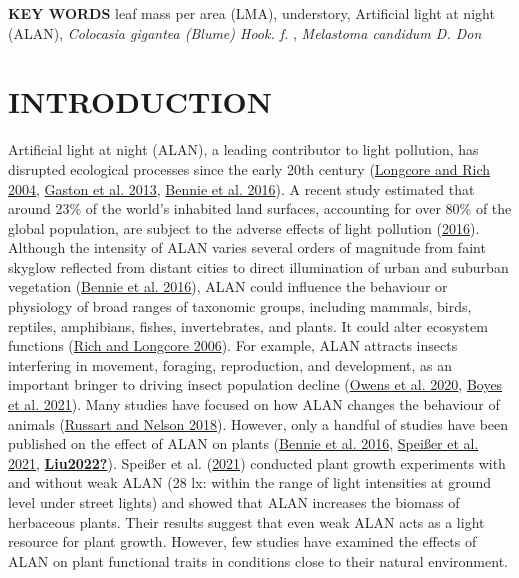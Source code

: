 \documentclass[
  12pt,
  letterpaper,
  DIV=11,
  numbers=noendperiod]{scrartcl}
\begin{document}
\textbf{KEY WORDS} leaf mass per area (LMA), understory, Artificial
light at night (ALAN), \emph{Colocasia gigantea (Blume) Hook. f.} ,
\emph{Melastoma candidum D. Don}

\hypertarget{introduction}{%
\section{INTRODUCTION}\label{introduction}}

Artificial light at night (ALAN), a leading contributor to light
pollution, has disrupted ecological processes since the early 20th
century (\protect\hyperlink{ref-Longcore2004}{Longcore and Rich 2004},
\protect\hyperlink{ref-Gaston2013}{Gaston et al. 2013},
\protect\hyperlink{ref-Bennie2016}{Bennie et al. 2016}). A recent study
estimated that around 23\% of the world's inhabited land surfaces,
accounting for over 80\% of the global population, are subject to the
adverse effects of light pollution
(\protect\hyperlink{ref-Falchi2016}{2016}). Although the intensity of
ALAN varies several orders of magnitude from faint skyglow reflected
from distant cities to direct illumination of urban and suburban
vegetation (\protect\hyperlink{ref-Bennie2016}{Bennie et al. 2016}),
ALAN could influence the behaviour or physiology of broad ranges of
taxonomic groups, including mammals, birds, reptiles, amphibians,
fishes, invertebrates, and plants. It could alter ecosystem functions
(\protect\hyperlink{ref-Rich2006}{Rich and Longcore 2006}). For example,
ALAN attracts insects interfering in movement, foraging, reproduction,
and development, as an important bringer to driving insect population
decline (\protect\hyperlink{ref-Owens2020}{Owens et al. 2020},
\protect\hyperlink{ref-Boyes2021}{Boyes et al. 2021}). Many studies have
focused on how ALAN changes the behaviour of animals
(\protect\hyperlink{ref-Russart2018}{Russart and Nelson 2018}). However,
only a handful of studies have been published on the effect of ALAN on
plants (\protect\hyperlink{ref-Bennie2016}{Bennie et al. 2016},
\protect\hyperlink{ref-Speisser2021a}{Speißer et al. 2021},
\protect\hyperlink{ref-Liu2022}{\textbf{Liu2022?}}). Speißer et al.
(\protect\hyperlink{ref-Speisser2021a}{2021}) conducted plant growth
experiments with and without weak ALAN (28 lx: within the range of light
intensities at ground level under street lights) and showed that ALAN
increases the biomass of herbaceous plants. Their results suggest that
even weak ALAN acts as a light resource for plant growth. However, few
studies have examined the effects of ALAN on plant functional traits in
conditions close to their natural environment.
\end{document}
